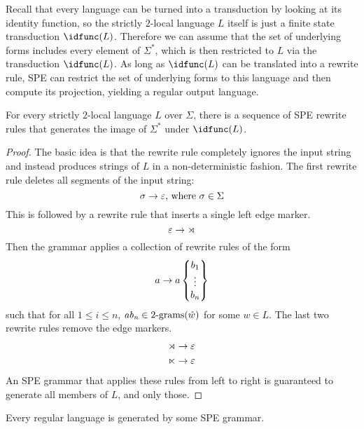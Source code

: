Recall that every language can be turned into a transduction by looking at its identity function, so the strictly $2$-local language $L$ itself is just a finite state transduction $\idfunc(L)$. 
Therefore we can assume that the set of underlying forms includes every element of $\Sigma^*$, which is then restricted to $L$ via the transduction $\idfunc(L)$.
As long as $\idfunc(L)$ can be translated into a rewrite rule, SPE can restrict the set of underlying forms to this language and then compute its projection, yielding a regular output language. 
%
\begin{lemma}
    For every strictly $2$-local language $L$ over $\Sigma$, there is a sequence of SPE rewrite rules that generates the image of $\Sigma^*$ under $\idfunc(L)$.
\end{lemma}
%
\begin{proof}
    The basic idea is that the rewrite rule completely ignores the input string and instead produces strings of $L$ in a non-deterministic fashion.
    The first rewrite rule deletes all segments of the input string:
    \[
        \sigma \rightarrow \varepsilon \text{, where } \sigma \in \Sigma
    \]
    This is followed by a rewrite rule that inserts a single left edge marker.
    \[
        \varepsilon \rightarrow \rtimes
    \]
    Then the grammar applies a collection of rewrite rules of the form
    \[
        a \rightarrow
            a
            \left \{
                \begin{matrix}
                    b_1\\
                    \vdots\\
                    b_n
                \end{matrix}
            \right \}
    \]
    such that for all $1 \leq i \leq n$, $\mathit{ab_n} \in 2\mathrm{\text{-}grams}(\hat{w})$ for some $w \in L$.
    The last two rewrite rules remove the edge markers.
    \begin{align*}
        \rtimes &\rightarrow \varepsilon\\
        \ltimes &\rightarrow \varepsilon
    \end{align*}
    An SPE grammar that applies these rules from left to right is guaranteed to generate all members of $L$, and only those.
\end{proof}
%
\begin{corollary}
    Every regular language is generated by some SPE grammar.
\end{corollary}


